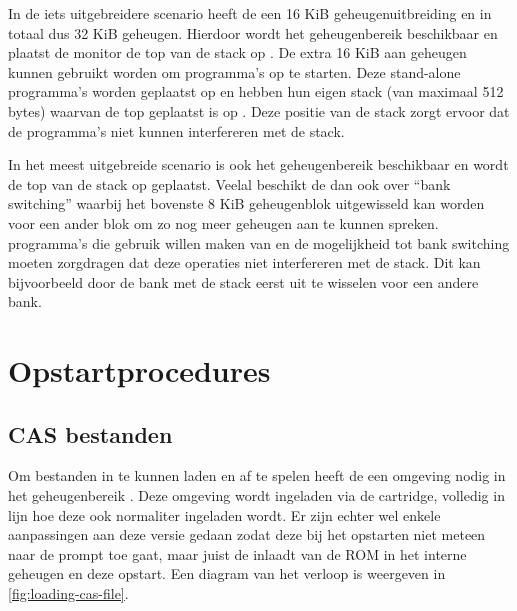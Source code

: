 
In de iets uitgebreidere scenario heeft de  een 16 KiB geheugenuitbreiding en in totaal dus 32 KiB geheugen. Hierdoor wordt het geheugenbereik  beschikbaar en plaatst de monitor de top van de stack op . De extra 16 KiB aan geheugen kunnen gebruikt worden om \prg programma's op te starten. Deze stand-alone programma's worden geplaatst op  en hebben hun eigen stack (van maximaal 512 bytes) waarvan de top geplaatst is op . Deze positie van de stack zorgt ervoor dat de programma's niet kunnen interfereren met de \basic stack.

In het meest uitgebreide scenario is ook het geheugenbereik  beschikbaar en wordt de top van de \basic stack op  geplaatst. Veelal beschikt de  dan ook over ``bank switching'' waarbij het bovenste 8 KiB geheugenblok uitgewisseld kan worden voor een ander blok om zo nog meer geheugen aan te kunnen spreken. \prg programma's die gebruik willen maken van  en de mogelijkheid tot bank switching moeten zorgdragen dat deze operaties niet interfereren met de \basic stack. Dit kan bijvoorbeeld door de bank met de \basic stack eerst uit te wisselen voor een andere bank.

%
%
%
\section{Opstartprocedures}

%
%
\subsection{CAS bestanden}


Om \cas bestanden in te kunnen laden en af te spelen heeft de \product een \basic omgeving nodig in het geheugenbereik . Deze \basic omgeving wordt ingeladen via de  cartridge, volledig in lijn hoe deze ook normaliter ingeladen wordt. Er zijn echter wel enkele aanpassingen aan deze \basic versie gedaan zodat deze bij het opstarten niet meteen naar de \basic prompt toe gaat, maar juist de \launcher inlaadt van de  ROM in het interne geheugen en deze opstart. Een diagram van het verloop is weergeven in \cref{fig:loading-cas-file}.

